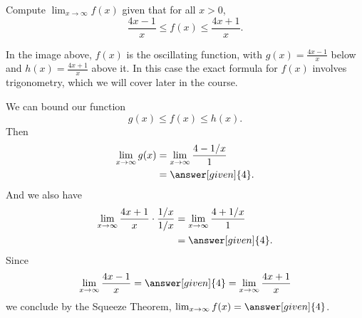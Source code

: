 \documentclass{ximera}
\begin{document}
\begin{example}
Compute $\lim_{x\to \infty} f(x)$ given that for all $x>0$, $$\frac{4x-1}{x}\leq f(x)\leq \frac{4x+1}{x}.$$

\begin{image}
\end{image}

In the image above, $f(x)$ is the oscillating function, with $g(x)=\frac{4x-1}{x}$ below and $h(x)=\frac{4x+1}{x}$ above it. In this case the exact formula for $f(x)$ involves trigonometry, which we will cover later in the course.

\begin{explanation}
We can bound our function
\[
g(x)\leq f(x)\leq h(x).
\]
Then
\begin{align*}
\lim_{x\to\infty}g(x) &= \lim_{x\to\infty}\frac{4-1/x}{1}\\
&=\answer[given]{4}.
\end{align*}
And we also have
\begin{align*}
\lim_{x\to\infty}\frac{4x+1}{x} \cdot \frac{1/x}{1/x} &= \lim_{x\to\infty}\frac{4+1/x}{1}\\
&=\answer[given]{4}.
\end{align*}
Since 
\[
\lim_{x\to \infty} \frac{4x-1}{x}  = \answer[given]{4} = \lim_{x\to \infty}\frac{4x+1}{x} 
\] 
we conclude by the Squeeze Theorem,
$\lim_{x\to\infty}f(x) = \answer[given]{4}$.
\end{explanation}
\end{example}











%
\end{document}
